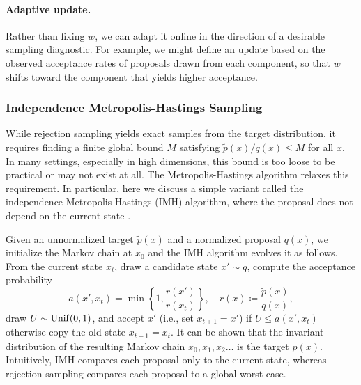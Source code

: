\paragraph{Adaptive update.}  
Rather than fixing $w$, we can adapt it online in the direction of a desirable sampling diagnostic. For example, we might define an update based on the observed acceptance rates of proposals drawn from each component, so that $w$ shifts toward the component that yields higher acceptance.

\subsubsection{Independence Metropolis-Hastings Sampling}
\label{app:imh}

While rejection sampling yields exact samples from the target distribution, it requires finding a finite global bound $M$ satisfying ${\tilde p}(x)/q(x) \leq M$ for all $x$. In many settings, especially in high dimensions, this bound is too loose to be practical or may not exist at all. The Metropolis-Hastings algorithm \citep{metropolis1953equation, hastings1970monte} relaxes this requirement.
In particular, here we discuss a simple variant called the independence Metropolis Hastings (IMH) algorithm, where the proposal does not depend on the current state \citep{tierney1994markov}.

Given an unnormalized target $\tilde p(x)$ and a normalized proposal $q(x)$, we initialize the Markov chain at $x_0$ and the IMH algorithm evolves it as follows. From the current state $x_t$, draw a candidate state $x' \sim q$, compute the acceptance probability
$$
a(x', x_t) = \min \left\{1, \frac{r(x')}{r(x_t)} \right\}, \quad r(x) \coloneqq \frac{\tilde p(x)}{q(x)},
$$
draw $U \sim {\rm Unif}(0, 1)$, and accept $x'$ (i.e., set $x_{t+1} = x'$) if $U \leq a(x', x_t)$ otherwise copy the old state $x_{t+1}=x_t$. It can be shown that the invariant distribution of the resulting Markov chain $x_0, x_1, x_2 \dotsc$ is the target $p(x)$. Intuitively, IMH compares each proposal only to the current state, whereas rejection sampling compares each proposal to a global worst case.

\clearpage
